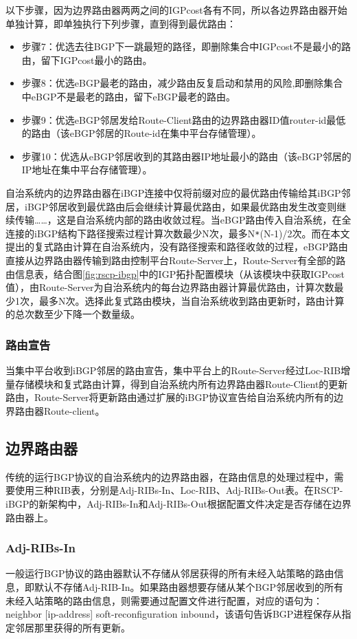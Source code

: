 以下步骤，因为边界路由器两两之间的IGPcost各有不同，所以各边界路由器开始单独计算，即单独执行下列步骤，直到得到最优路由：
\begin{itemize}
    \item 步骤7：优选去往BGP下一跳最短的路径，即删除集合中IGPcost不是最小的路由，留下IGPcost最小的路由。
    \item 步骤8：优选eBGP最老的路由，减少路由反复启动和禁用的风险,即删除集合中eBGP不是最老的路由，留下eBGP最老的路由。
    \item 步骤9：优选eBGP邻居发给Route-Client路由的边界路由器ID值router-id最低的路由（该eBGP邻居的Route-id在集中平台存储管理）。
    \item 步骤10：优选从eBGP邻居收到的其路由器IP地址最小的路由（该eBGP邻居的IP地址在集中平台存储管理）。
\end{itemize}


自治系统内的边界路由器在iBGP连接中仅将前缀对应的最优路由传输给其iBGP邻居，iBGP邻居收到最优路由后会继续计算最优路由，如果最优路由发生改变则继续传输……，这是自治系统内部的路由收敛过程。当eBGP路由传入自治系统，在全连接的iBGP结构下路径搜索过程计算次数最少N次，最多N\verb+*+(N-1)/2次。而在本文提出的复式路由计算在自治系统内，没有路径搜索和路径收敛的过程，eBGP路由直接从边界路由器传输到路由控制平台Route-Server上，Route-Server有全部的路由信息表，结合图\ref{fig:rscp-ibgp}中的IGP拓扑配置模块（从该模块中获取IGPcost值），由Route-Server为自治系统内的每台边界路由器计算最优路由，计算次数最少1次，最多N次。选择此复式路由模块，当自治系统收到路由更新时，路由计算的总次数至少下降一个数量级。

\subsubsection{路由宣告}
当集中平台收到iBGP邻居的路由宣告，集中平台上的Route-Server经过Loc-RIB增量存储模块和复式路由计算，得到自治系统内所有边界路由器Route-Client的更新路由，Route-Server将更新路由通过扩展的iBGP协议宣告给自治系统内所有的边界路由器Route-client。

\subsection{边界路由器}
传统的运行BGP协议的自治系统内的边界路由器，在路由信息的处理过程中，需要使用三种RIB表，分别是Adj-RIBs-In、Loc-RIB、Adj-RIBs-Out表。在RSCP-iBGP的新架构中，Adj-RIBs-In和Adj-RIBs-Out根据配置文件决定是否存储在边界路由器上。

\subsubsection{Adj-RIBs-In}
一般运行BGP协议的路由器默认不存储从邻居获得的所有未经入站策略的路由信息，即默认不存储Adj-RIB-In。如果路由器想要存储从某个BGP邻居收到的所有未经入站策略的路由信息，则需要通过配置文件进行配置，对应的语句为：neighbor [ip-address] soft-reconfiguration inbound，该语句告诉BGP进程保存从指定邻居那里获得的所有更新。


